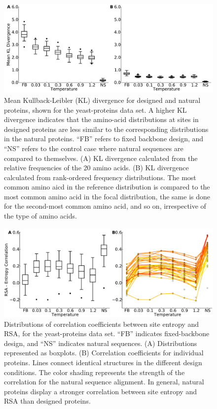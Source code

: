 \documentclass[12pt]{article}
\begin{document}
\begin{figure}[H]
\centerline{\includegraphics[width = 6in]{figures/Mean_KL_vs_Temp_Boxplot.pdf}}
\caption{Mean Kullback-Leibler (KL) divergence for designed and natural proteins, shown for the yeast-proteins data set. A higher KL divergence indicates that the amino-acid distributions at sites in designed proteins are less similar to the corresponding distributions in the natural proteins. ``FB'' refers to fixed backbone design, and ``NS'' refers to the control case where natural sequences are compared to themselves. (A) KL divergence calculated from the relative frequencies of the 20 amino acids. (B) KL divergence calculated from rank-ordered frequency distributions. The most common amino aicd in the reference distribution is compared to the most common amino acid in the focal distribution, the same is done for the second-most common amino acid, and so on, irrespective of the type of amino acids.}
\label{AADisFig1}
\end{figure}


\begin{figure}[H]
\centerline{\includegraphics[width = 6in]{figures/Cor_Mean_Entropy_RSA_Combination_Plot.pdf}}
\caption{Distributions of correlation coefficients between site entropy and RSA, for the yeast-proteins data set. ``FB'' indicates fixed-backbone design, and ``NS'' indicates natural sequences. (A) Distributions represented as boxplots. (B) Correlation coefficients for individual proteins. Lines connect identical structures in the different design conditions. The color shading represents the strength of the correlation for the natural sequence alignment. In general, natural proteins display a stronger correlation between site entropy and RSA than designed proteins.}
\label{Correlation_figure}
\end{figure}
\end{document}
